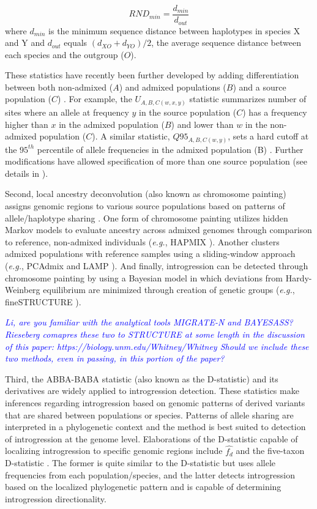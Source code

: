 \documentclass[11pt]{article}
\newcommand{\gmj}[1]{\textcolor{blue}{ \emph{\scriptsize  #1}} } %
\begin{document}
 \begin{equation}
 	RND_{min} = \frac{d_{min}}{d_{out}}
 \end{equation}
where $d_{min}$ is the minimum sequence distance between haplotypes in species X and Y and $d_{out}$ equals $(d_{XO} + d_{YO})/2$, the average sequence distance between each species and the outgroup ($O$).
 
These statistics have recently been further developed by adding differentiation between both non-admixed ($A$) and admixed populations ($B$) and a source population ($C$) \cite{racimo2016}. 
For example, the $U_{A,B,C(w,x,y)}$ statistic summarizes number of sites where an allele at frequency $y$ in the source population ($C$) has a frequency higher than $x$ in the admixed population ($B$) and lower than $w$ in the non-admixed population ($C$).
A similar statistic, $Q95_{A,B,C(w,y)}$, sets a hard cutoff at the $95^{th}$ percentile of allele frequencies in the admixed population (B) \cite{racimo2016}.
Further modifications have allowed specification of more than one source population (see details in \cite{racimo2016}).
 
Second, local ancestry deconvolution (also known as chromosome painting) assigns genomic regions to various source populations based on patterns of allele/haplotype sharing \cite{schraiber2015}. 
One form of chromosome painting utilizes hidden Markov models to evaluate ancestry across admixed genomes through comparison to reference, non-admixed individuals (\emph{e.g.}, HAPMIX \cite{Price2009}). 
Another clusters admixed populations with reference samples using a sliding-window approach (\emph{e.g.}, PCAdmix \cite{brisbin2012pcadmix} and LAMP \cite{sankararaman2008}).
And finally, introgression can be detected through chromosome painting by using a Bayesian model \cite{pritchard2000} in which deviations from Hardy-Weinberg equilibrium are minimized through creation of genetic groups (\emph{e.g.}, fineSTRUCTURE \cite{Lawson2012}). 

\gmj{Li, are you familiar with the analytical tools MIGRATE-N and BAYESASS?  Rieseberg comapres these two to STRUCTURE at some length in the discussion of this paper:
https://biology.unm.edu/Whitney/Whitney%
Should we include these two methods, even in passing, in this portion of the paper?}

Third, the ABBA-BABA statistic (also known as the D-statistic) and its derivatives are widely applied to introgression detection.
These statistics make inferences regarding introgression based on genomic patterns of derived variants that are shared between populations or species.
Patterns of allele sharing are interpreted in a phylogenetic context and the method is best suited to detection of introgression at the genome level.
Elaborations of the D-statistic capable of localizing introgression to specific genomic regions include $\hat{f_{d}}$ \cite{Martin2015} and the five-taxon D-statistic \cite{pease2015}. 
The former is quite similar to the D-statistic but uses allele frequencies from each population/species, and the latter detects introgression based on the localized phylogenetic pattern and is capable of determining introgression directionality.
\end{document}
